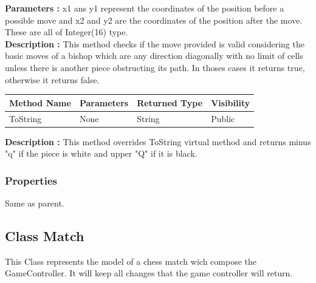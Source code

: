 \documentclass[12pt]{article}
\begin{document}
\textbf{Parameters :} x1 ans y1 represent the coordinates of the position before a possible move
and x2 and y2 are the coordinates of the position after the move. These are all of Integer(16) type.
\\
\textbf{Description :} This method checks if the move provided is valid considering the basic moves of a bishop which
are any direction diagonally with no limit of cells unless there is another piece obstructing its path. In thoses 
cases it returns true, otherwise it returns false. 

\begin{table}[H]
    \begin{tabular}{|l|l|l|l|}
    \hline
    \rowcolor[HTML]{EFEFEF} 
    \cellcolor[HTML]{EFEFEF}\textbf{Method Name} & \textbf{Parameters}  & \textbf{Returned Type} & \textbf{Visibility} \\ \hline
    ToString                                   & None                 & String                   & Public              \\ \hline
    \end{tabular}
\end{table}

\textbf{Description :} This method overrides ToString virtual
method and returns minus "q" if the piece is white and upper "Q"
if it is black.

\subsubsection{Properties}

Same as parent.

\newpage


\subsection{Class Match}

This Class represents the model of a chess match wich compose the
GameController. It will keep all changes that the game controller will return.
\end{document}
